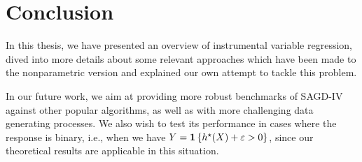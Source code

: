 \chapter{Conclusion}
\label{conclusion}

In this thesis, we have presented an overview of instrumental variable regression, dived into more details about some relevant approaches which have been made to the nonparametric version and explained our own attempt to tackle this problem.

In our future work, we aim at providing more robust benchmarks of SAGD-IV against other popular algorithms, as well as with more challenging data generating processes.
We also wish to test its performance in cases where the response is binary, i.e., when we have $ Y = \mathbf{1} \left\{ h^{ \star } ( X ) + \varepsilon > 0 \right\} $, since our theoretical results are applicable in this situation.





